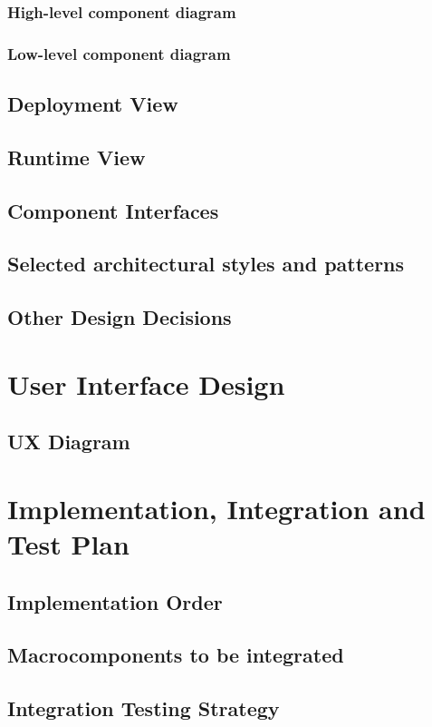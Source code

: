 \documentclass[12pt]{article}
\begin{document}
\subsubsection{High-level component diagram}
\subsubsection{Low-level component diagram}

\subsection{Deployment View}\label{deploymentview}

\subsection{Runtime View}\label{runtimeview}

\subsection{Component Interfaces}\label{componentinterfaces}

\subsection{Selected architectural styles and patterns}\label{archstyles}

\subsection{Other Design Decisions}\label{otherdecisions}

\clearpage
\section{User Interface Design}
\subsection{UX Diagram}

\clearpage
\section{Implementation, Integration and Test Plan}
\subsection{Implementation Order}

\subsection{Macrocomponents to be integrated}
\subsection{Integration Testing Strategy}

\end{document}
